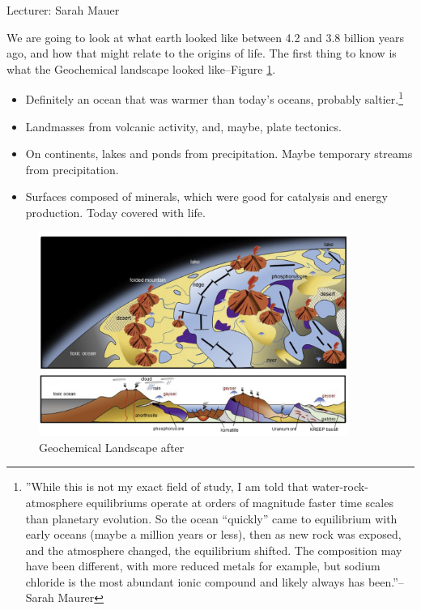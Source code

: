 \documentclass[]{article}
\begin{document}
Lecturer: Sarah Mauer

We are going to look at what earth looked like between 4.2 and 3.8 billion years ago, and how that might relate to the origins of life. The first thing to know is what the Geochemical landscape looked like--Figure \ref{fig:GeochemicalLandscape}.

  \begin{itemize}
	\item  Definitely an ocean that was warmer than today's oceans, probably saltier.\footnote{''While this is not my exact field of study, I am told that water-rock-atmosphere equilibriums operate at orders of magnitude faster time scales than planetary evolution. So the ocean “quickly” came to equilibrium with early oceans (maybe a million years or less), then as new rock was exposed, and the atmosphere changed, the equilibrium shifted. The composition may have been different, with more reduced metals for example, but sodium chloride is the most abundant ionic compound and likely always has been.''--Sarah Maurer}\cite{knauth1998salinity} 
	\item Landmasses from volcanic activity, and, maybe, plate tectonics.
	\item On continents, lakes and ponds from precipitation.  Maybe temporary streams from precipitation.
	\item Surfaces composed of minerals, which were good for catalysis and energy production. Today covered with life.
\end{itemize}

\begin{figure}[H]
	\caption[Geochemical Landscape]{Geochemical Landscape after \cite{kitadai2018origins}} \label{fig:GeochemicalLandscape}
	\includegraphics[width=0.9\textwidth]{GeochemicalLandscape}
\end{figure}
\end{document}
